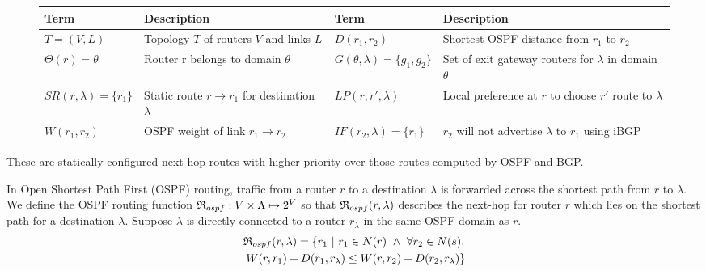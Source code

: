\begin{figure}
\vspace{-2mm}
\small
\centering
\begin{minipage}{\linewidth}
	\begin{tabular}{m{7em}  m{12em} | m{8em} m{12em} } 
		{\bf Term} & {\bf Description} & {\bf Term} & {\bf Description} \\ 
		\hline
		$T=(V,L)$ & Topology $T$ of routers $V$ and links $L$ & $D(r_1, r_2)$ & Shortest OSPF distance from $r_1$ to $r_2$ \\ \hline
		$\Theta(r) = \theta$ & Router r belongs to domain $\theta$ & $G(\theta, \lambda) = \{g_1, g_2\}$ & Set of exit gateway routers for $\lambda$ in domain $\theta$  \\ \hline
		$SR(r,\lambda)=\{r_1\}$ & Static route $r \rightarrow r_1$ for \newline destination $\lambda$ & $LP(r, r', \lambda)$ &  Local preference at $r$ to choose $r'$ route to $\lambda$ \\ \hline
		$W(r_1, r_2)$ & OSPF weight of link $r_1 \rightarrow r_2$ & $IF(r_2, \lambda) = \{r_1\}$ & $r_2$ will not advertise $\lambda$ to $r_1$ using iBGP 
	\end{tabular}
	\end{minipage}
	\label{tab:zeppelinconfig}
\end{figure}


These are statically configured next-hop routes with higher 
priority over those routes computed by OSPF and BGP.

 In Open Shortest Path First (OSPF) routing,
traffic from a router $r$ to a destination $\lambda$ is forwarded across 
the shortest path from $r$ to $\lambda$.
We define the OSPF routing function $\mathfrak{R}_{ospf}: 
V \times \Lambda \mapsto 2^V$ so that
$\mathfrak{R}_{ospf}(r,\lambda)$ describes the next-hop for
router $r$ which lies on the shortest path for a destination $\lambda$. 
\iffull
Suppose $\lambda$ is directly connected to a router $r_\lambda$ 
in the same OSPF domain as $r$.
\begin{multline*}
\mathfrak{R}_{ospf}(r,\lambda) = \{r_1 ~|~ r_1 \in N(r)~\wedge~ \forall r_2 \in N(s). \\ ~W(r, r_1) + D(r_1, r_\lambda) \le 
W(r, r_2) + D(r_2, r_\lambda)\}
\end{multline*}
\fi

